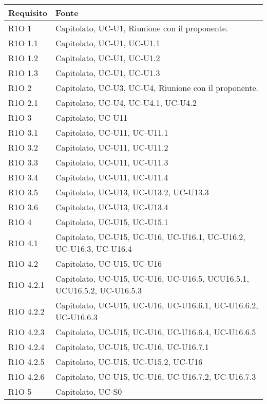 \begin{center}
  \bgroup
  \def\arraystretch{1.8}
  \begin{longtable}{ | l | p{8cm} | }
    \hline
    \cellcolor[gray]{0.9} \textbf{Requisito} &   
    \cellcolor[gray]{0.9} \textbf{Fonte}\\ \hline
    R1O 1 & Capitolato, UC-U1, Riunione con il proponente. \\ \hline
    R1O 1.1 & Capitolato, UC-U1, UC-U1.1 \\ \hline
    R1O 1.2 & Capitolato, UC-U1, UC-U1.2 \\ \hline
    R1O 1.3 & Capitolato, UC-U1, UC-U1.3 \\ \hline
    R1O 2 & Capitolato, UC-U3, UC-U4, Riunione con il proponente. \\ \hline
    R1O 2.1 & Capitolato, UC-U4, UC-U4.1, UC-U4.2 \\ \hline
    R1O 3 & Capitolato, UC-U11 \\ \hline
    R1O 3.1 & Capitolato, UC-U11, UC-U11.1\\ \hline
    R1O 3.2 & Capitolato, UC-U11, UC-U11.2\\ \hline
    R1O 3.3 & Capitolato, UC-U11, UC-U11.3\\ \hline
    R1O 3.4 & Capitolato, UC-U11, UC-U11.4\\ \hline
    R1O 3.5 & Capitolato, UC-U13, UC-U13.2, UC-U13.3\\ \hline
    R1O 3.6 & Capitolato, UC-U13, UC-U13.4\\ \hline
    R1O 4 & Capitolato, UC-U15, UC-U15.1 \\ \hline
    R1O 4.1 & Capitolato, UC-U15, UC-U16, UC-U16.1, UC-U16.2, UC-U16.3, UC-U16.4 \\ \hline
    R1O 4.2 & Capitolato, UC-U15, UC-U16 \\ \hline
    R1O 4.2.1 & Capitolato, UC-U15, UC-U16, UC-U16.5, UCU16.5.1, UCU16.5.2, UC-U16.5.3 \\ \hline
    R1O 4.2.2 & Capitolato, UC-U15, UC-U16, UC-U16.6.1, UC-U16.6.2, UC-U16.6.3 \\ \hline
    R1O 4.2.3 & Capitolato, UC-U15, UC-U16, UC-U16.6.4, UC-U16.6.5 \\ \hline
    R1O 4.2.4 & Capitolato, UC-U15, UC-U16, UC-U16.7.1 \\ \hline
    R1O 4.2.5 & Capitolato, UC-U15, UC-U15.2, UC-U16 \\ \hline
    R1O 4.2.6 & Capitolato, UC-U15, UC-U16, UC-U16.7.2, UC-U16.7.3 \\ \hline
    R1O 5 & Capitolato, UC-S0 \\ \hline

\end{longtable}
\end{center}
